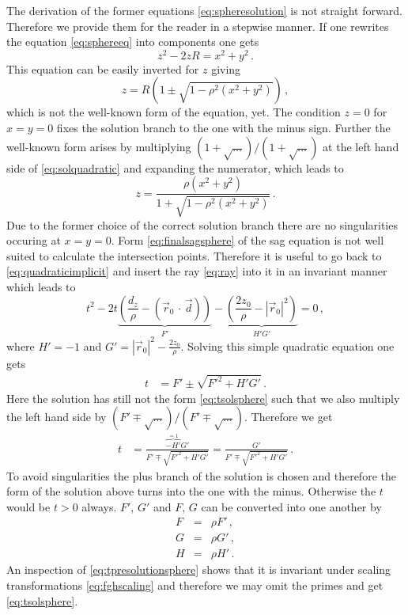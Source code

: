 \documentclass[12pt,a4paper,twoside,openright,BCOR10mm,headsepline,titlepage,abstracton,chapterprefix,final]{scrreprt}
\newcommand\Location{\Vector{r}}
\newcommand\Vector[1]{\vec{#1}}
\newcommand{\scpm}[2]{(#1\,\cdot\,#2)}
\begin{document}
The derivation of the former equations \eqref{eq:spheresolution} is not straight forward. Therefore we provide them for the reader in a stepwise manner.
If one rewrites the equation \eqref{eq:sphereeq} into components one gets
\begin{equation}
 z^2 - 2 z R = x^2 + y^2 \label{eq:quadraticimplicit}\,.
\end{equation}
This equation can be easily inverted for $z$ giving
\begin{equation}
 z = R \left(1\pm\sqrt{1 - \rho^2 (x^2 + y^2)}\right)\label{eq:solquadratic}\,,
\end{equation}
which is not the well-known form of the equation, yet.
The condition $z=0$ for $x=y=0$ fixes the solution branch to the one 
with the minus sign. Further the well-known form arises by multiplying 
$(1+ \sqrt{\dots})/(1+\sqrt{\dots})$ at the left hand side
of \eqref{eq:solquadratic} and expanding the numerator, which leads to
\begin{equation}
 z = \frac{\rho (x^2 + y^2)}{1 + \sqrt{1 - \rho^2 (x^2 + y^2)}} \label{eq:finalsagsphere}\,.
\end{equation}
Due to the former choice of the correct solution branch there are no
singularities occuring at $x=y=0$. Form \eqref{eq:finalsagsphere} of the 
sag equation is not well suited to calculate the intersection points. Therefore it is 
useful to go back to \eqref{eq:quadraticimplicit} and insert the ray \eqref{eq:ray}
into it in an invariant manner which leads to
\begin{equation}
 t^2 - 2 t \underbrace{\left(\frac{d_z}{\rho} - \scpm{\Location_0}{\vec{d}}\right)}_{F'} 
    - \underbrace{\left(\frac{2 z_0}{\rho} - |\Location_0|^2\right)}_{H' G'} = 0\,,\label{eq:teqsphere}
\end{equation}
where $H' = -1$ and $G' = |\Location_0|^2 - \tfrac{2 z_0}{\rho}$.
Solving this simple quadratic equation one gets
\begin{align}
 t &= F' \pm \sqrt{{F'}^2 + H' G'}\,.
\end{align}
Here the solution has still not the form \eqref{eq:tsolsphere} such that
we also multiply the left hand side by $(F' \mp \sqrt{\dots})/(F' \mp \sqrt{\dots})$.
Therefore we get
\begin{align}
 t &= \frac{\overbrace{-H'}^{=1} G'}{F' \mp \sqrt{{F'}^2 + H' G'}} = \frac{G'}{F' \mp \sqrt{{F'}^2 + H' G'}}\label{eq:tpresolutionsphere}\,.
\end{align}
To avoid singularities the plus branch of the solution is chosen and therefore the
form of the solution above turns into the one with the minus. Otherwise the $t$ would be
$t>0$ always. $F'$, $G'$ and $F$, $G$ can be converted into one another by
\begin{subequations}
\label{eq:fghscaling}
\begin{eqnarray}
 F &=& \rho F'\,,\\
 G &=& \rho G'\,,\\
 H &=& \rho H'\,.
\end{eqnarray}
\end{subequations}
An inspection of \eqref{eq:tpresolutionsphere} shows that it is invariant under scaling transformations \eqref{eq:fghscaling}
and therefore we may omit the primes and get \eqref{eq:tsolsphere}.
\end{document}
